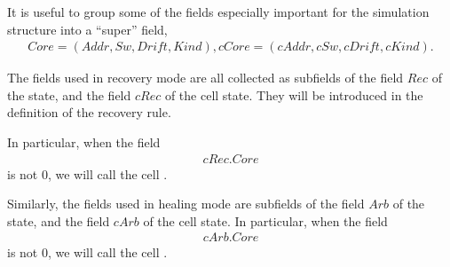 \documentclass[12pt]{memoir}
\newcommand{\fld}[1]{\ensuremath{\textit{#1}}}
\newcommand{\Z}{Z}
\newcommand{\Addr}{\fld{Addr}}
\newcommand{\cAddr}{\fld{cAddr}}
\newcommand{\Arb}{\fld{Arb}}
\newcommand{\cArb}{\fld{cArb}}
\newcommand{\Core}{\fld{Core}}
\newcommand{\cCore}{\fld{cCore}}
\newcommand{\Drift}{\fld{Drift}}
\newcommand{\cDrift}{\fld{cDrift}}
\newcommand{\Kind}{\fld{Kind}}
\newcommand{\cKind}{\fld{cKind}}
\newcommand{\Rec}{\fld{Rec}}
\newcommand{\cRec}{\fld{cRec}}
\newcommand{\Sweep}{\fld{Sw}}
\newcommand{\cSweep}{\fld{cSw}}
\newcommand{\ZigDepth}{\fld{ZigDepth}}
\newcommand{\ZigDir}{\fld{ZigDir}}
\begin{document}
It is useful to group some of the fields especially important for the simulation structure into
a ``super'' field,
    \begin{align}\label{eq:Core}
       \Core=(\Addr, \Sweep, \Drift, \Kind), 
        \cCore=(\cAddr, \cSweep, \cDrift, \cKind). %
    \end{align}


  The fields used in recovery mode are all collected as subfields of the field
    \( \Rec \) of the state, and the field \( \cRec \) of the cell state.
    They will be introduced in the definition of the recovery rule.

    In particular, when the field
     \begin{align}\label{eq:cRecCore}
      \cRec.\Core
     \end{align}
    is not \( 0 \), we will call the cell .

    Similarly, the fields used in healing mode are subfields of the field \( \Arb \) of the state,
    and the field \( \cArb \) of the cell state.
    In particular, when the field
     \begin{align}\label{eq:cArbCore}
      \cArb.\Core
     \end{align}
    is not \( 0 \), we will call the cell .


\end{document}
